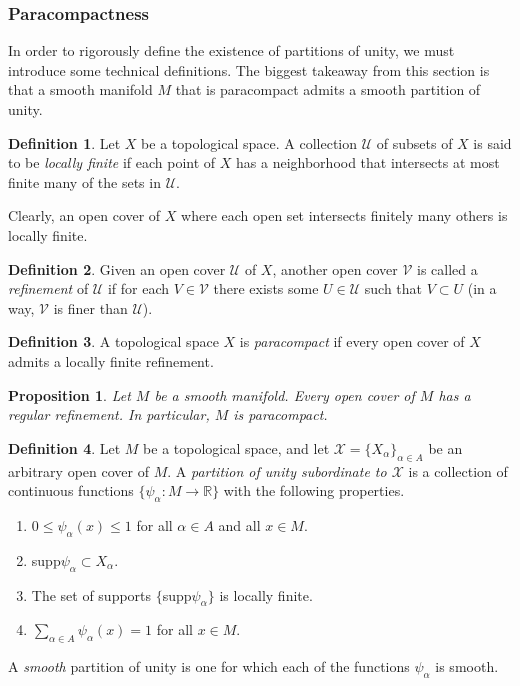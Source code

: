 \documentclass{article}
\newtheorem{proposition}[theorem]{Proposition}
\theoremstyle{remark}
\theoremstyle{definition}
\newtheorem{definition}{Definition}[section]
\begin{document}
\subsubsection{Paracompactness}
In order to rigorously define the existence of partitions of unity, we must introduce some technical definitions. The biggest takeaway from this section is that a smooth manifold $M$ that is paracompact admits a smooth partition of unity. 

\begin{definition}
Let $X$ be a topological space. A collection $\mathcal{U}$ of subsets of $X$ is said to be \textit{locally finite} if each point of $X$ has a neighborhood that intersects at most finite many of the sets in $\mathcal{U}$. 

Clearly, an open cover of $X$ where each open set intersects finitely many others is locally finite.
\end{definition}

\begin{definition}
Given an open cover $\mathcal{U}$ of $X$, another open cover $\mathcal{V}$ is called a \textit{refinement} of $\mathcal{U}$ if for each $V \in \mathcal{V}$ there exists some $U \in \mathcal{U}$ such that $V \subset U$ (in a way, $\mathcal{V}$ is finer than $\mathcal{U}$).  
\end{definition}

\begin{definition}
A topological space $X$ is \textit{paracompact} if every open cover of $X$ admits a locally finite refinement. 
\end{definition}

\begin{proposition}
Let $M$ be a smooth manifold. Every open cover of $M$ has a regular refinement. In particular, $M$ is paracompact. 
\end{proposition}

\begin{definition}
Let $M$ be a topological space, and let $\mathcal{X} = \{X_\alpha\}_{\alpha \in A}$ be an arbitrary open cover of $M$. A \textit{partition of unity subordinate to $\mathcal{X}$} is a collection of continuous functions $\{ \psi_\alpha: M \longrightarrow \mathbb{R}\}$ with the following properties. 
\begin{enumerate}
    \item $0 \leq \psi_\alpha (x) \leq 1$ for all $\alpha \in A$ and all $x \in M$. 
    \item supp$\psi_\alpha \subset X_\alpha$. 
    \item The set of supports $\{$supp$\psi_\alpha\}$ is locally finite. 
    \item $\sum_{\alpha \in A} \psi_\alpha (x) = 1$ for all $x \in M$. 
\end{enumerate}
A \textit{smooth} partition of unity is one for which each of the functions $\psi_\alpha$ is smooth. 
\end{definition}
\end{document}
